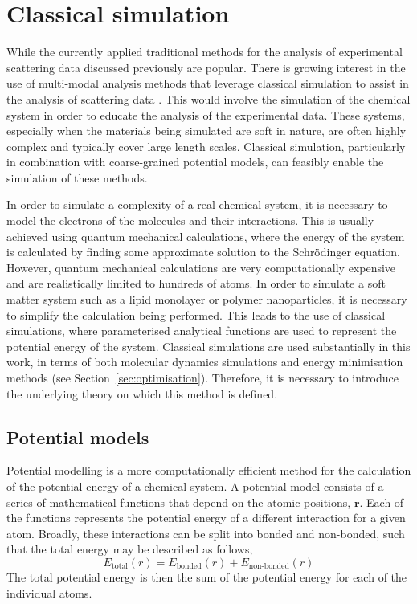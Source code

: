 \section{Classical simulation}
\label{sec:classical}

While the currently applied traditional methods for the analysis of experimental scattering data discussed previously are popular.
There is growing interest in the use of multi-modal analysis methods that leverage classical simulation to assist in the analysis of scattering data \cite{ivanovic_temperature-dependent_2018,scoppola_combining_2018,dabkowska_modulation_2014,hub_interpreting_2018}.
This would involve the simulation of the chemical system in order to educate the analysis of the experimental data.
These systems, especially when the materials being simulated are soft in nature, are often highly complex and typically cover large length scales.
Classical simulation, particularly in combination with coarse-grained potential models, can feasibly enable the simulation of these methods.

In order to simulate a complexity of a real chemical system, it is necessary to model the electrons of the molecules and their interactions.
This is usually achieved using quantum mechanical calculations, where the energy of the system is calculated by finding some approximate solution to the Schr\"{o}dinger equation.
However, quantum mechanical calculations are very computationally expensive and are realistically limited to hundreds of atoms.
In order to simulate a soft matter system such as a lipid monolayer or polymer nanoparticles, it is necessary to simplify the calculation being performed.
This leads to the use of classical simulations, where parameterised analytical functions are used to represent the potential energy of the system.
Classical simulations are used substantially in this work, in terms of both molecular dynamics simulations and energy minimisation methods (see Section~\ref{sec:optimisation}).
Therefore, it is necessary to introduce the underlying theory on which this method is defined.

\subsection{Potential models}
\label{sec:potentmodels}
Potential modelling is a more computationally efficient method for the calculation of the potential energy of a chemical system.
A potential model consists of a series of mathematical functions that depend on the atomic positions, $\mathbf{r}$.
Each of the functions represents the potential energy of a different interaction for a given atom.
Broadly, these interactions can be split into bonded and non-bonded, such that the total energy may be described as follows,
%
\begin{equation}
  E_{\text{total}}(r) = E_{\text{bonded}}(r) + E_{\text{non-bonded}}(r)
\end{equation}
%
The total potential energy is then the sum of the potential energy for each of the individual atoms.

